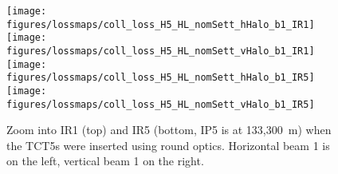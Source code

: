 \begin{figure} [!htb]
\begin{center}

\texttt{[image: figures/lossmaps/coll\_loss\_H5\_HL\_nomSett\_hHalo\_b1\_IR1]}
\texttt{[image: figures/lossmaps/coll\_loss\_H5\_HL\_nomSett\_vHalo\_b1\_IR1]}
\texttt{[image: figures/lossmaps/coll\_loss\_H5\_HL\_nomSett\_hHalo\_b1\_IR5]}
\texttt{[image: figures/lossmaps/coll\_loss\_H5\_HL\_nomSett\_vHalo\_b1\_IR5]}
\end{center}
\vspace{-0.3cm}
 \caption{Zoom into IR1 (top) and IR5 (bottom, IP5 is at 133,300~m) when the TCT5s were inserted using round optics. Horizontal beam 1 is on the left, vertical beam 1 on the right.
  \label{IR15_roundB1_nomSett}}
\end{figure}







